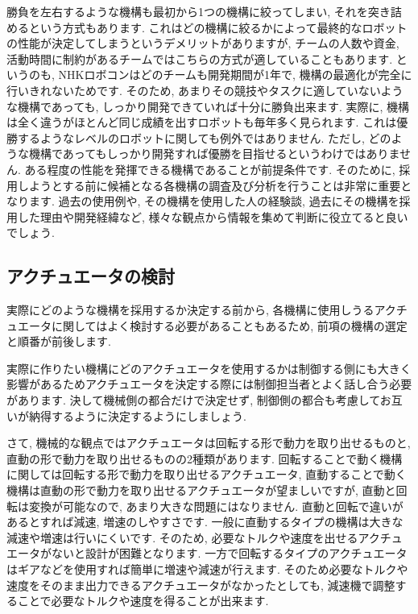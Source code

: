 勝負を左右するような機構も最初から1つの機構に絞ってしまい, それを突き詰めるという方式もあります. 
これはどの機構に絞るかによって最終的なロボットの性能が決定してしまうというデメリットがありますが, チームの人数や資金, 活動時間に制約があるチームではこちらの方式が適していることもあります. 
というのも, NHKロボコンはどのチームも開発期間が1年で, 機構の最適化が完全に行いきれないためです. そのため, あまりその競技やタスクに適していないような機構であっても, しっかり開発できていれば十分に勝負出来ます. 実際に, 機構は全く違うがほとんど同じ成績を出すロボットも毎年多く見られます. これは優勝するようなレベルのロボットに関しても例外ではありません.
ただし, どのような機構であってもしっかり開発すれば優勝を目指せるというわけではありません. ある程度の性能を発揮できる機構であることが前提条件です. そのために, 採用しようとする前に候補となる各機構の調査及び分析を行うことは非常に重要となります. 過去の使用例や, その機構を使用した人の経験談, 過去にその機構を採用した理由や開発経緯など, 様々な観点から情報を集めて判断に役立てると良いでしょう. 

\subsection{アクチュエータの検討}
実際にどのような機構を採用するか決定する前から, 各機構に使用しうるアクチュエータに関してはよく検討する必要があることもあるため, 前項の機構の選定と順番が前後します. 

実際に作りたい機構にどのアクチュエータを使用するかは制御する側にも大きく影響があるためアクチュエータを決定する際には制御担当者とよく話し合う必要があります. 決して機械側の都合だけで決定せず, 制御側の都合も考慮してお互いが納得するように決定するようにしましょう. 

さて, 機械的な観点ではアクチュエータは回転する形で動力を取り出せるものと, 直動の形で動力を取り出せるものの2種類があります. 回転することで動く機構に関しては回転する形で動力を取り出せるアクチュエータ, 直動することで動く機構は直動の形で動力を取り出せるアクチュエータが望ましいですが, 直動と回転は変換が可能なので, あまり大きな問題にはなりません. 直動と回転で違いがあるとすれば減速, 増速のしやすさです. 一般に直動するタイプの機構は大きな減速や増速は行いにくいです. そのため, 必要なトルクや速度を出せるアクチュエータがないと設計が困難となります. 
一方で回転するタイプのアクチュエータはギアなどを使用すれば簡単に増速や減速が行えます. そのため必要なトルクや速度をそのまま出力できるアクチュエータがなかったとしても, 減速機で調整することで必要なトルクや速度を得ることが出来ます. 

